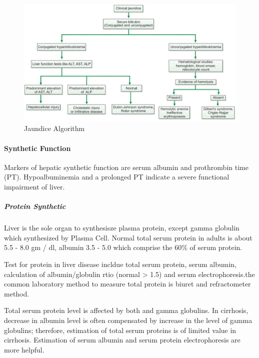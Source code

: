 \documentclass[
  letterpaper,
  DIV=11,
  numbers=noendperiod]{scrreprt}
\let\oldparagraph\paragraph
\renewcommand{\paragraph}[1]{\oldparagraph{#1}\mbox{}}
\let\oldsubparagraph\subparagraph
\renewcommand{\subparagraph}[1]{\oldsubparagraph{#1}\mbox{}}
\begin{document}
\begin{figure}

{\centering \includegraphics{image/jaundice_algorithm.png}

}

\caption{Jaundice Algorithm}

\end{figure}%

\paragraph{Synthetic Function}\label{synthetic-function}

Markers of hepatic synthetic function are serum albumin and prothrombin
time (PT). Hypoalbuminemia and a prolonged PT indicate a severe
functional impairment of liver.

\subparagraph{Protein Synthetic}\label{protein-synthetic}

Liver is the sole organ to synthesisze plasma protein, except gamma
globulin which synthesized by Plasma Cell. Normal total serum protein in
adults is about 5.5 - 8.0 gm / dl, albumin 3.5 - 5.0 which comprise the
60\% of serum protein.

Test for protein in liver disease incldue total serum protein, serum
albumin, calculation of albumin/globulin rtio (normal \textgreater{}
1.5) and serum electrophoresis.the common laboratory method to measure
total protein is biuret and refractometer method.

Total serum protein level is affected by both and gamma globulins. In
cirrhosis, decrease in albumin level is often compensated by increase in
the level of gamma globulins; therefore, estimation of total serum
proteins is of limited value in cirrhosis. Estimation of serum albumin
and serum protein electrophoresis are more helpful.
\end{document}
